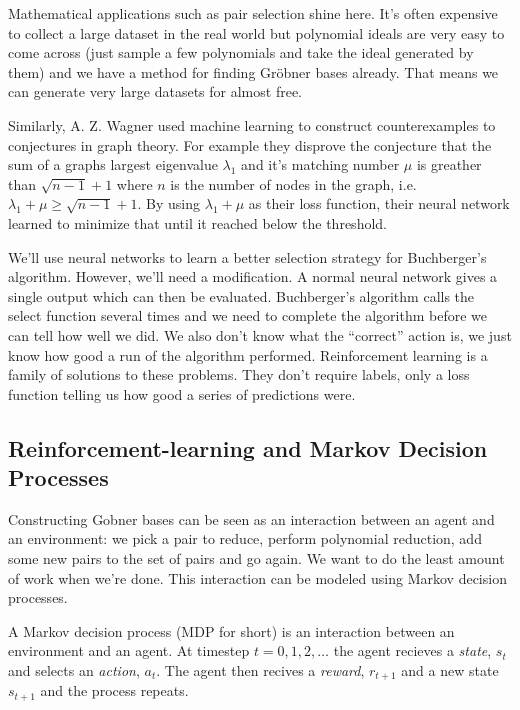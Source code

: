 \documentclass{article}
\theoremstyle{changedot}
\theoremstyle{changedotbreak}
\theoremstyle{nonumberplain}
\begin{document}
Mathematical applications such as pair selection shine here. It's often expensive to collect a large dataset in the real world but polynomial ideals are very easy to come across (just sample a few polynomials and take the ideal generated by them) and we have a method for finding Gröbner bases already. That means we can generate very large datasets for almost free.

Similarly, A. Z. Wagner\cite{RLgraphs} used machine learning to construct counterexamples to conjectures in graph theory. For example they disprove the conjecture that the sum of a graphs largest eigenvalue $\lambda_{1}$ and it's matching number $\mu$ is greather than $\sqrt{n - 1} + 1$ where $n$ is the number of nodes in the graph, i.e. $\lambda_{1} + \mu \geq \sqrt{n - 1} + 1$. By using $\lambda_{1} + \mu$ as their loss function, their neural network learned to minimize that until it reached below the threshold.

We'll use neural networks to learn a better selection strategy for Buchberger's algorithm. However, we'll need a modification. A normal neural network gives a single output which can then be evaluated. Buchberger's algorithm calls the select function several times and we need to complete the algorithm before we can tell how well we did. We also don't know what the ``correct'' action is, we just know how good a run of the algorithm performed. Reinforcement learning is a family of solutions to these problems. They don't require labels, only a loss function telling us how good a series of predictions were.

\subsection{Reinforcement-learning and Markov Decision Processes}

Constructing Gobner bases can be seen as an interaction between an agent and an environment: we pick a pair to reduce, perform polynomial reduction, add some new pairs to the set of pairs and go again. We want to do the least amount of work when we're done. This interaction can be modeled using Markov decision processes.

A Markov decision process (MDP for short) is an interaction between an environment and an agent. At timestep $t = 0, 1, 2, \dots$ the agent recieves a \emph{state}, $s_{t}$ and selects an \emph{action}, $a_{t}$. The agent then recives a \emph{reward}, $r_{t+1}$ and a new state $s_{t+1}$ and the process repeats.
\end{document}
